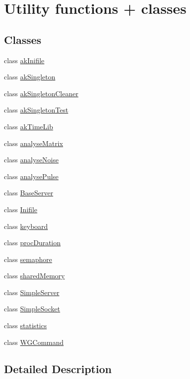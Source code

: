 \hypertarget{group__akutil__group}{\section{Utility functions + classes}
\label{group__akutil__group}
}
\subsection*{Classes}
\begin{DoxyCompactItemize}
\item 
class \hyperlink{classakInifile}{ak\-Inifile}
\item 
class \hyperlink{classakSingleton}{ak\-Singleton}
\item 
class \hyperlink{classakSingletonCleaner}{ak\-Singleton\-Cleaner}
\item 
class \hyperlink{classakSingletonTest}{ak\-Singleton\-Test}
\item 
class \hyperlink{classakTimeLib}{ak\-Time\-Lib}
\item 
class \hyperlink{classanalyseMatrix}{analyse\-Matrix}
\item 
class \hyperlink{classanalyseNoise}{analyse\-Noise}
\item 
class \hyperlink{classanalysePulse}{analyse\-Pulse}
\item 
class \hyperlink{classBaseServer}{Base\-Server}
\item 
class \hyperlink{classInifile}{Inifile}
\item 
class \hyperlink{classkeyboard}{keyboard}
\item 
class \hyperlink{classprocDuration}{proc\-Duration}
\item 
class \hyperlink{classsemaphore}{semaphore}
\item 
class \hyperlink{classsharedMemory}{shared\-Memory}
\item 
class \hyperlink{classSimpleServer}{Simple\-Server}
\item 
class \hyperlink{classSimpleSocket}{Simple\-Socket}
\item 
class \hyperlink{classstatistics}{statistics}
\item 
class \hyperlink{classWGCommand}{W\-G\-Command}
\end{DoxyCompactItemize}


\subsection{Detailed Description}
